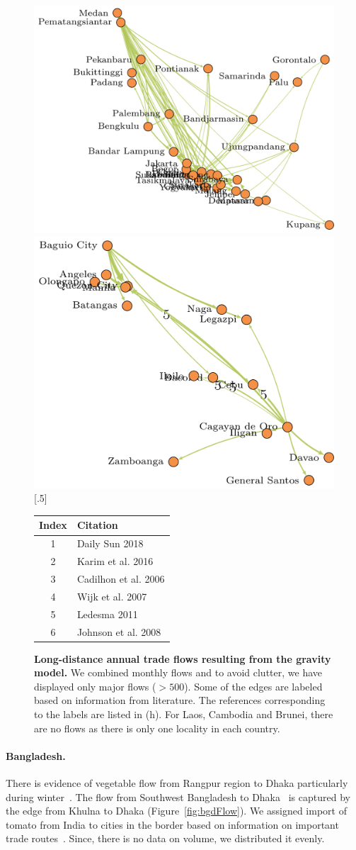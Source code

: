 \documentclass[10pt]{article}
\theoremstyle{definition}
\begin{document}
\begin{figure}[!ht]
{\includegraphics[width=.33\textwidth]{../long_distance/results/validation/IDN_flows_precip1_b2_k500.pdf}}
{\includegraphics[width=.33\textwidth]{../long_distance/results/validation/PHL_flows_precip1_b2_k500.pdf}}
[.5\textwidth]{
    \small
\begin{tabular}{cl}
\hline
Index & Citation \\\hline
1 & Daily Sun 2018 \cite{dailysun2018}\\
2 & Karim et al. 2016 \cite{karim2016}\\
3 & Cadilhon et al. 2006 \cite{cadilhon2006}\\
4 & Wijk et al. 2007 \cite{wijk2007}\\
5 & Ledesma 2011 \cite{ledesma2011}\\
6 & Johnson et al. 2008 \cite{johnson2008}\\\hline
\end{tabular}
}
\caption{\textbf{Long-distance annual trade flows resulting from the gravity model.}
We combined monthly flows and to avoid clutter, we have displayed only major
    flows ($>500$). Some of the edges
    are labeled based on information from literature. The references
    corresponding to the labels are listed in (h). For Laos, Cambodia and
    Brunei, there are no flows as there is only one locality in each
    country. \label{fig:trade_flows}}
\end{figure}
\paragraph{Bangladesh.}
There is evidence of vegetable flow from Rangpur region to Dhaka
particularly during winter~\cite{dailysun2018,independent2018}. The flow
from Southwest Bangladesh to Dhaka~\cite{karim2016} is captured by the edge
from Khulna to Dhaka (Figure~\ref{fig:bgdFlow}). We assigned import of
tomato from India to cities in the border based on information on important
trade routes~\cite{EIIndia2015}.  Since, there is no data on volume, we
distributed it evenly.
\end{document}
